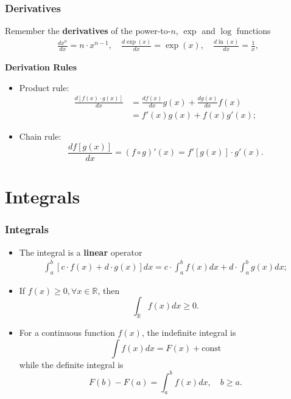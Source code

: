 \documentclass[notes=show, handout]{beamer}\usepackage[]{graphicx}\usepackage[]{color}
\newcommand{\bea}{\begin{eqnarray}}
\newcommand{\eea}{\end{eqnarray}}
\newcommand{\nn}{\nonumber}
\begin{document}
\begin{frame}
\frametitle{Derivatives}

Remember the \textbf{derivatives} of the power-to-$n$, $\exp$ and $\log$ functions
\bea
 \frac{d x^n}{dx} = n \cdot x^{n-1}, \quad \frac{d \exp(x)}{dx} = \exp(x) , \quad
\frac{d \ln({x})}{dx} = \frac{1}{x}, \nn
\eea

\pause

\textbf{Derivation Rules}

\begin{itemize}
\item Product rule:
\begin{align*}
\frac{d [f(x)\cdot g(x)]}{dx} &= \frac{df(x)}{dx} g(x) + \frac{dg(x)}{dx} f(x) \nn \\
&= f'(x) g(x)+ f(x) g'(x) \nn ;
\end{align*}
\pause
\item Chain rule: $$ \frac{d f[g(x)]}{dx} =  (f\circ g)'(x) = f'[g(x)] \cdot g'(x). $$
\end{itemize}
\end{frame}

\section{Integrals}
\begin{frame}
\frametitle{Integrals}

\begin{itemize}
\item The integral is a \textbf{linear} operator
\bea
\int_{a}^{b} \left[c \cdot f(x) + d \cdot g(x) \right]dx = c  \cdot \int_{a}^{b}   f(x) dx + d \cdot \int_{a}^{b}   g(x) dx; \nn
\eea
\pause
\item If $f(x) \geq 0, \forall x \in \mathbb{R}$, then
$$ \int_{\mathbb{R}} f(x) dx \geq 0. $$
\pause
\item For a continuous function $f(x)$, the indefinite integral is
$$
\int f(x) dx = F(x) + \text{const}
$$
while the definite integral is
$$
F(b)-F(a)= \int_{a}^{b} f(x) dx, \quad b \geq a.
$$
\end{itemize}
\end{frame}
\end{document}
